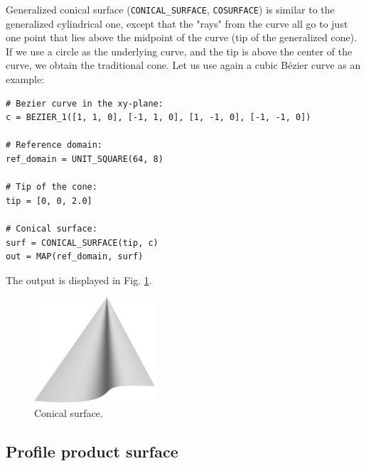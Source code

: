 Generalized conical surface ({\tt CONICAL\_SURFACE}, {\tt COSURFACE}) 
is similar to the generalized cylindrical 
one, except that the "rays" from the curve all go to just one
point that lies above the midpoint of the curve (tip of the generalized cone). 
If we use a circle as the underlying curve, and the tip is above the center of the curve, 
we obtain the traditional cone. Let us use again a cubic B\'ezier curve
as an example:\\

\begin{bbox}
\begin{verbatim}
# Bezier curve in the xy-plane:
c = BEZIER_1([1, 1, 0], [-1, 1, 0], [1, -1, 0], [-1, -1, 0])

# Reference domain:
ref_domain = UNIT_SQUARE(64, 8)

# Tip of the cone:
tip = [0, 0, 2.0]

# Conical surface:
surf = CONICAL_SURFACE(tip, c)
out = MAP(ref_domain, surf)
\end{verbatim}
\end{bbox}
\vspace{6mm}

\noindent
The output is displayed in Fig. \ref{fig:curves-12}.

\begin{figure}[!ht]
\begin{center}
\includegraphics[width=0.4\textwidth]{img/curves-12.png}
\end{center}
\vspace{-4mm}
\caption{Conical surface.}
\label{fig:curves-12}
\end{figure}



\subsection{Profile product surface}

